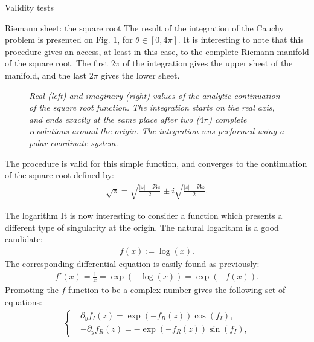\begin{section}{Validity tests}
\begin{subsection}{Riemann sheet: the square root}
    The result of the integration of the Cauchy problem is presented
    on Fig. \ref{fig:3d_sqrt}, for $\theta \in [0,4\pi]$. It is interesting to
    note that this procedure gives an access, at least in this case,
    to the complete Riemann manifold of the square root. The first
    $2\pi$ of the integration gives the upper sheet of the manifold,
    and the last $2\pi$ gives the lower sheet.
    
    \begin{figure}[!ht]
      \begin{center}
        
        
        \caption{\em Real (left) and imaginary (right) values of the
          analytic continuation of the square root function. The
          integration starts on the real axis, and ends exactly at the
          same place after two ($4\pi$) complete revolutions around
          the origin. The integration was performed using a polar
          coordinate system.}
        \label{fig:3d_sqrt}
      \end{center}
    \end{figure}
    The procedure is valid for this simple function, and converges to
    the continuation of the square root defined by:
    \begin{align}
      \sqrt{z} = \sqrt{\frac{\left|z\right|+\Re z}{2}}\pm i\sqrt{\frac{\left|z\right|-\Re z}{2}}.
    \end{align}
  \end{subsection}
  \begin{subsection}{The logarithm}
    It is now interesting to consider a function which presents a
    different type of singularity at the origin. The natural logarithm
    is a good candidate:
    \begin{align}
      f(x) := \log(x).
    \end{align}
    The corresponding differential equation is easily found as previously:
    \begin{align}
      f'(x) = \frac{1}{x} = \exp(-\log(x)) = \exp(-f(x)).
    \end{align}
    Promoting the $f$ function to be a complex number gives the
    following set of equations:
    \begin{align}
      \left\{
      \begin{aligned}
        &\partial_yf_I(z) = \exp(-f_R(z))\cos(f_I),\\
        &-\partial_yf_R(z) = -\exp(-f_R(z))\sin(f_I),
      \end{aligned}

\end{align}
\end{subsection}
\end{section}
